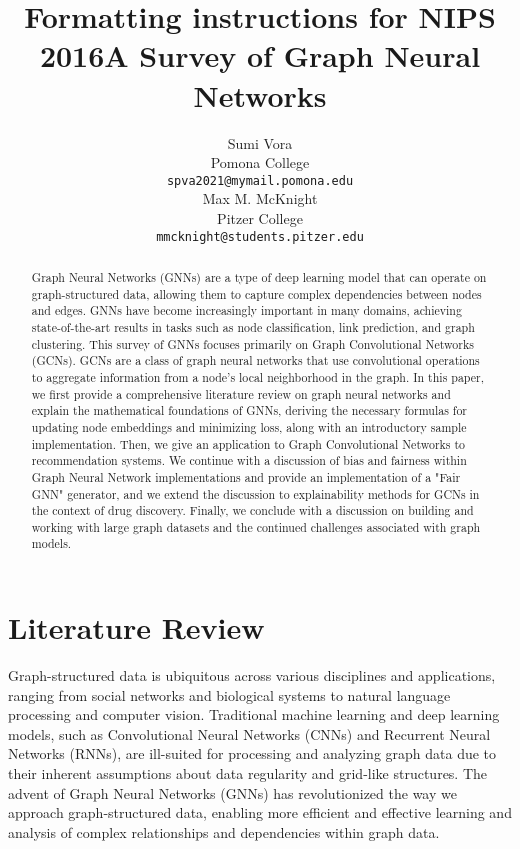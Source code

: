 \documentclass[final]{article}
\title{Formatting instructions for NIPS 2016}
\author{
Sumi Vora \\
Pomona College \\
\texttt{spva2021@mymail.pomona.edu} \\
\AND
Max M. McKnight \\
Pitzer College \\
\texttt{mmcknight@students.pitzer.edu}
}
\begin{document}

\title{A Survey of Graph Neural Networks}



\maketitle

\begin{abstract}
Graph Neural Networks (GNNs) are a type of deep learning model that can operate on graph-structured data, allowing them to capture complex dependencies between nodes and edges. GNNs have become increasingly important in many domains, achieving state-of-the-art results in tasks such as node classification, link prediction, and graph clustering. This survey of GNNs focuses primarily on Graph Convolutional Networks (GCNs). GCNs are a class of graph neural networks that use convolutional operations to aggregate information from a node's local neighborhood in the graph. In this paper, we first provide a comprehensive literature review on graph neural networks and explain the mathematical foundations of GNNs, deriving the necessary formulas for updating node embeddings and minimizing loss, along with an introductory sample implementation. Then, we give an application to Graph Convolutional Networks to recommendation systems. We continue with a discussion of bias and fairness within Graph Neural Network implementations and provide an implementation of a "Fair GNN" generator, and we extend the discussion to explainability methods for GCNs in the context of drug discovery. Finally, we conclude with a discussion on building and working with large graph datasets and the continued challenges associated with graph models.
\end{abstract}


\newpage 

\section{Literature Review} 
Graph-structured data is ubiquitous across various disciplines and applications, ranging from social networks and biological systems to natural language processing and computer vision. Traditional machine learning and deep learning models, such as Convolutional Neural Networks (CNNs) and Recurrent Neural Networks (RNNs), are ill-suited for processing and analyzing graph data due to their inherent assumptions about data regularity and grid-like structures. The advent of Graph Neural Networks (GNNs) has revolutionized the way we approach graph-structured data, enabling more efficient and effective learning and analysis of complex relationships and dependencies within graph data.
\end{document}
